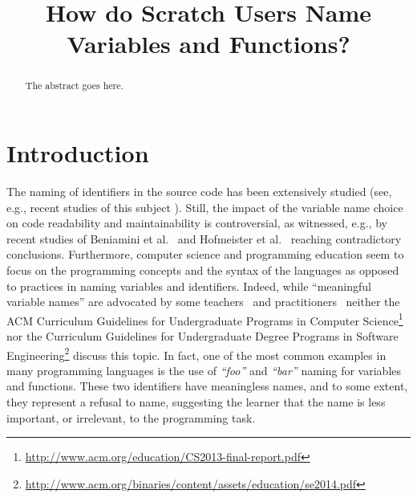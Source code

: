 \documentclass[conference]{IEEEtran}
\newcommand{\todo}[1]{ \textbf{#1} }
\newcommand{\quotes}[1]{\textit{``#1''}}
\begin{document}
\title{How do Scratch Users Name Variables and Functions? }

\author{
\and
{}
}
\maketitle

\begin{abstract}
The abstract goes here.
\end{abstract}

\IEEEpeerreviewmaketitle



\section{Introduction}
The naming of identifiers in the source code has been extensively studied (see, e.g., recent studies of this subject \cite{AmanASK15,AvidanF17,Beniamini,ButlerWYS10,HofmeisterSH17,LunguK13,ScannielloR13,TramontanaRS14}).
Still, the impact of the variable name choice on code readability and maintainability is controversial, as witnessed, e.g., by recent studies of Beniamini et al.~\cite{Beniamini} and Hofmeister et al.~\cite{HofmeisterSH17} reaching contradictory conclusions.
%
Furthermore, computer science and programming education seem to focus on the programming concepts and the syntax of the languages as opposed to practices in naming variables and identifiers. 
Indeed, while ``meaningful variable names'' are advocated by some teachers~\cite{Kato2016} and practitioners~\cite{Rother} neither the ACM Curriculum Guidelines for Undergraduate Programs in Computer Science\footnote{\url{http://www.acm.org/education/CS2013-final-report.pdf}} nor the Curriculum Guidelines for Undergraduate Degree Programs in Software Engineering\footnote{\url{http://www.acm.org/binaries/content/assets/education/se2014.pdf}} discuss this topic.
In fact, one of the most common examples in many programming languages is the use of \quotes{foo} and \quotes{bar} naming for variables and functions. 
These two identifiers have meaningless names, and to some extent, they represent a refusal to name, suggesting the learner that the name is less important, or irrelevant, to the programming task. 
\end{document}
